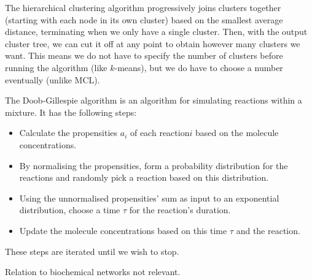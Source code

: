 \begin{enumerate}[label=(\alph*)]
      The hierarchical clustering algorithm progressively joins clusters together (starting with each node in its own cluster) based on the smallest average distance, terminating when we only have a single cluster. Then, with the output cluster tree, we can cut it off at any point to obtain however many clusters we want. This means we do not have to specify the number of clusters before running the algorithm (like $k$-means), but we do have to choose a number eventually (unlike MCL).

      \ite
      The Doob-Gillespie algorithm is an algorithm for simulating reactions within a mixture. It has the following steps:

      \begin{itemize}
          \item
            Calculate the propensities $a_i$ of each reaction$i$ based on the molecule concentrations.

            \item
              By normalising the propensities, form a probability distribution for the reactions and randomly pick a reaction based on this distribution.

              \item
                Using the unnormalised propensities' sum as input to an exponential distribution, choose a time $\tau$ for the reaction's duration.
                
                \item
                  Update the molecule concentrations based on this time $\tau$ and the reaction.
      \end{itemize}

      These steps are iterated until we wish to stop.

      Relation to biochemical networks not relevant.


        
    \end{enumerate}

